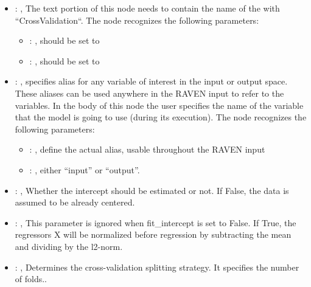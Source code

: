 \begin{itemize}
    \item {}: , 
      The text portion of this node needs to contain the name of the  with
               ``CrossValidation``.
      The  node recognizes the following parameters:
        \begin{itemize}
          \item {}: , 
            should be set to 
          \item {}: , 
            should be set to 
      \end{itemize}

    \item {}: , 
      specifies alias for         any variable of interest in the input or output space. These
      aliases can be used anywhere in the RAVEN input to         refer to the variables. In the body
      of this node the user specifies the name of the variable that the model is going to use
      (during its execution).
      The  node recognizes the following parameters:
        \begin{itemize}
          \item {}: , 
            define the actual alias, usable throughout the RAVEN input
          \item {}: , 
            either ``input'' or ``output''.
      \end{itemize}

    \item {}: , 
      Whether the intercept should be estimated or not. If False,
      the data is assumed to be already centered.

    \item {}: , 
      This parameter is ignored when fit\_intercept is set to False. If True, the
      regressors X will be normalized before regression by subtracting the mean and dividing
      by the l2-norm.

    \item {}: , 
      Determines the cross-validation splitting strategy.
      It specifies the number of folds..


\end{itemize}
